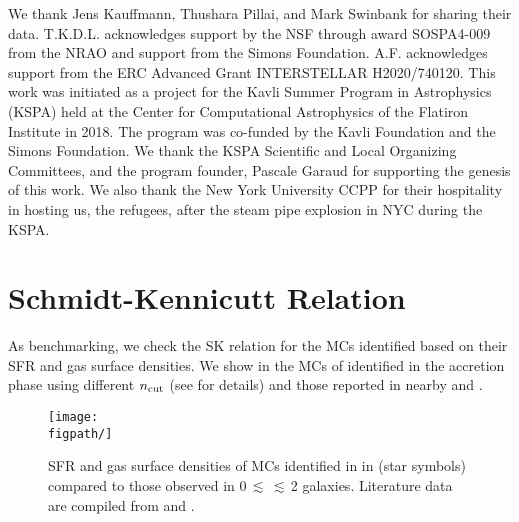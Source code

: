 \IfFileExists{emulateapjlegacy.cls}{\documentclass[iop]{emulateapjlegacy}}{\documentclass[iop]{emulateapj}}
\begin{document}


\acknowledgements

We thank Jens Kauffmann, Thushara Pillai, and Mark Swinbank for sharing their data.
T.K.D.L. acknowledges support by the NSF through award SOSPA4-009
from the NRAO and support from the Simons Foundation.
A.F. acknowledges support from the ERC Advanced Grant INTERSTELLAR H2020/740120.
This work was initiated as a project for the Kavli Summer Program in Astrophysics (KSPA)
held at the Center for
Computational Astrophysics of the Flatiron Institute in 2018. The program was co-funded by the Kavli
Foundation and the Simons Foundation.
We thank the KSPA Scientific and Local Organizing Committees, and the program founder,
Pascale Garaud for supporting the genesis of this work.
We also thank the New York University CCPP for their hospitality in hosting us, the refugees, after the steam pipe explosion in NYC during the KSPA.







\appendix
\section{Schmidt-Kennicutt Relation}
As benchmarking, we check the SK relation for the MCs identified based on their SFR and gas surface densities.
We show in  the MCs of \flower identified in the accretion phase using different $n_{\rm cut}$
(see  for details) and those reported in nearby and \highz \obs \citep{Kennicutt98a, Bouche07a, Daddi10a, Daddi10b, Genzel10a, Tacconi10a}. 


\begin{figure*}[htbp]
\centering
\texttt{[image: \\figpath/]}
\caption{
SFR and gas surface densities of MCs identified in \flower in  (star symbols) compared to those 
observed in 0\,$\lesssim$\,\z$\lesssim$\,2 galaxies.
Literature data are compiled from \citealt{Kennicutt98a, Bouche07a, Daddi10a, Daddi10b, Genzel10a, Tacconi10a} and 
\citealt{Pallottini17b}.
\label{fig:sk}}
\end{figure*}




%

%
\end{document}
